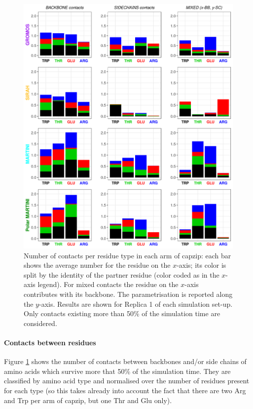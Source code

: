 \begin{figure}[p!]
\centering
\includegraphics[width=0.95\linewidth]{3results_capsule/pics/new_rep1_allFF.png}
\caption[Contacts between buckyball molecules]{Number of contacts per residue type in each arm of capzip: each bar shows the average number for the residue on the $x$-axis; its color is split by the identity of the partner residue (color coded as in the $x$-axis legend). For mixed contacts the residue on the $x$-axis contributes with its backbone. The parametrisation is reported along the $y$-axis. Results are shown for Replica 1 of each simulation set-up. Only contacts existing more than 50\% of the simulation time are considered.}
\label{fig:BTI_cont}
\end{figure}

\paragraph{Contacts between residues} Figure \ref{fig:BTI_cont} shows the number of contacts between backbones and/or side chains of amino acids which survive more that 50\% of the simulation time. They are classified by amino acid type and normalised over the number of residues present for each type (so this takes already into account the fact that there are two Arg and Trp per arm of capzip, but one Thr and Glu only).

